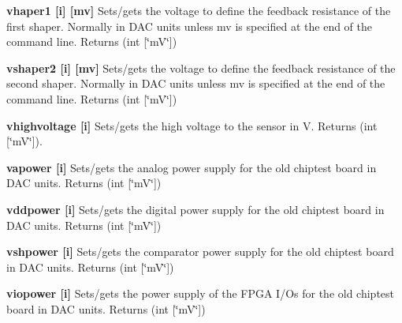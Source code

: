 \begin{DoxyItemize}
\item {\bfseries vhaper1 \mbox{[}i\mbox{]} \mbox{[}mv\mbox{]}} Sets/gets the voltage to define the feedback resistance of the first shaper. Normally in DAC units unless {\ttfamily mv} is specified at the end of the command line. {\ttfamily Returns} {\ttfamily }(int \mbox{[}\char`\"{}mV\char`\"{}\mbox{]})
\end{DoxyItemize}


\begin{DoxyItemize}
\item {\bfseries vshaper2 \mbox{[}i\mbox{]} \mbox{[}mv\mbox{]}} Sets/gets the voltage to define the feedback resistance of the second shaper. Normally in DAC units unless {\ttfamily mv} is specified at the end of the command line. {\ttfamily Returns} {\ttfamily }(int \mbox{[}\char`\"{}mV\char`\"{}\mbox{]})
\end{DoxyItemize}


\begin{DoxyItemize}
\item {\bfseries vhighvoltage \mbox{[}i\mbox{]}} Sets/gets the high voltage to the sensor in V. {\ttfamily Returns} {\ttfamily }(int \mbox{[}\char`\"{}mV\char`\"{}\mbox{]}).
\end{DoxyItemize}


\begin{DoxyItemize}
\item {\bfseries vapower \mbox{[}i\mbox{]}} Sets/gets the analog power supply for the old chiptest board in DAC units. {\ttfamily Returns} {\ttfamily }(int \mbox{[}\char`\"{}mV\char`\"{}\mbox{]})
\end{DoxyItemize}


\begin{DoxyItemize}
\item {\bfseries vddpower \mbox{[}i\mbox{]}} Sets/gets the digital power supply for the old chiptest board in DAC units. {\ttfamily Returns} {\ttfamily }(int \mbox{[}\char`\"{}mV\char`\"{}\mbox{]})
\end{DoxyItemize}


\begin{DoxyItemize}
\item {\bfseries vshpower \mbox{[}i\mbox{]}} Sets/gets the comparator power supply for the old chiptest board in DAC units. {\ttfamily Returns} {\ttfamily }(int \mbox{[}\char`\"{}mV\char`\"{}\mbox{]})
\end{DoxyItemize}


\begin{DoxyItemize}
\item {\bfseries viopower \mbox{[}i\mbox{]}} Sets/gets the power supply of the FPGA I/Os for the old chiptest board in DAC units. {\ttfamily Returns} {\ttfamily }(int \mbox{[}\char`\"{}mV\char`\"{}\mbox{]})
\end{DoxyItemize}


